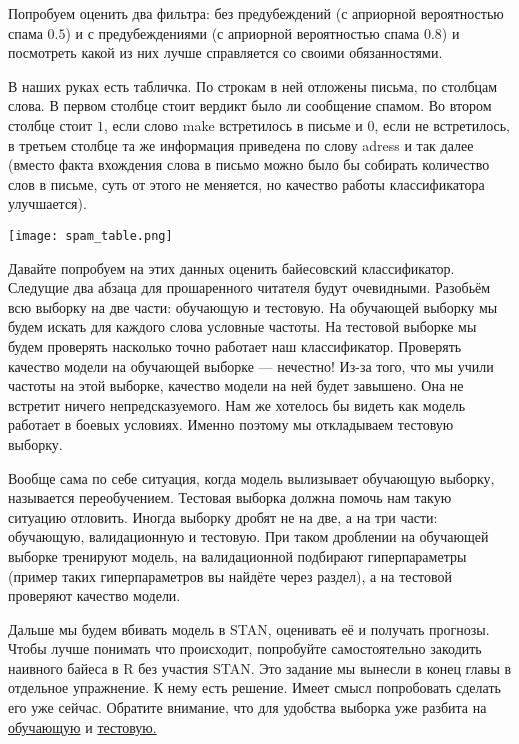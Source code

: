 Попробуем оценить два фильтра: без предубеждений (с априорной вероятностью спама $0.5$) и с предубеждениями (с априорной вероятностью спама $0.8$) и посмотреть какой из них лучше справляется со своими обязанностями.  

В наших руках есть табличка. По строкам в ней отложены письма, по столбцам слова.  В первом столбце стоит вердикт было ли сообщение спамом. Во втором столбце стоит $1$, если слово make встретилось в письме и $0$, если не встретилось, в третьем столбце та же информация приведена по слову adress и так далее (вместо факта вхождения слова в письмо можно было бы собирать количество слов в письме, суть от этого не меняется, но качество работы классификатора улучшается).

\begin{center}
\texttt{[image: spam\_table.png]}
\end{center}

Давайте попробуем на этих данных оценить байесовский классификатор. Следущие два абзаца для прошаренного читателя будут очевидными. Разобьём всю выборку на две части: обучающую и тестовую. На обучающей выборку мы будем искать для каждого слова условные частоты. На тестовой выборке мы будем проверять насколько точно работает наш классификатор.  Проверять качество модели на обучающей выборке --- нечестно!  Из-за того, что мы учили частоты на этой выборке, качество модели на ней будет завышено. Она не встретит ничего непредсказуемого. Нам же хотелось бы видеть как модель работает в боевых условиях.  Именно поэтому мы откладываем тестовую выборку. 

Вообще сама по себе ситуация, когда модель вылизывает обучающую выборку, называется переобучением. Тестовая выборка должна помочь нам такую ситуацию отловить. Иногда выборку дробят не на две, а на три части: обучающую, валидационную и тестовую. При таком дроблении на обучающей выборке тренируют модель, на валидационной подбирают гиперпараметры (пример таких гиперпараметров вы найдёте через раздел), а на тестовой проверяют качество модели. 

Дальше мы будем вбивать модель в STAN, оценивать её и получать прогнозы. Чтобы лучше понимать что происходит, попробуйте самостоятельно закодить наивного байеса в R без участия STAN. Это задание мы вынесли в конец главы в отдельное упражнение. К нему есть решение. Имеет смысл попробовать сделать его уже сейчас. Обратите внимание, что для удобства выборка уже разбита на \href{https://raw.githubusercontent.com/FUlyankin/bayes_book/master/itog_scripts/naive_bayes/spam_train.csv}{обучающую} и \href{https://raw.githubusercontent.com/FUlyankin/bayes_book/master/itog_scripts/naive_bayes/spam_test.csv}{тестовую.} 

